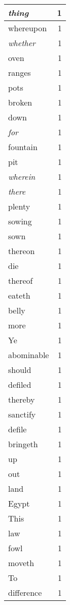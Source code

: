 \begin{center}
\begin{longtable}{l|r}
\emph{thing} & 1 \\ \hline
whereupon & 1 \\ \hline
\emph{whether} & 1 \\ \hline
oven & 1 \\ \hline
ranges & 1 \\ \hline
pots & 1 \\ \hline
broken & 1 \\ \hline
down & 1 \\ \hline
\emph{for} & 1 \\ \hline
fountain & 1 \\ \hline
pit & 1 \\ \hline
\emph{wherein} & 1 \\ \hline
\emph{there} & 1 \\ \hline
plenty & 1 \\ \hline
sowing & 1 \\ \hline
sown & 1 \\ \hline
thereon & 1 \\ \hline
die & 1 \\ \hline
thereof & 1 \\ \hline
eateth & 1 \\ \hline
belly & 1 \\ \hline
more & 1 \\ \hline
Ye & 1 \\ \hline
abominable & 1 \\ \hline
should & 1 \\ \hline
defiled & 1 \\ \hline
thereby & 1 \\ \hline
sanctify & 1 \\ \hline
defile & 1 \\ \hline
bringeth & 1 \\ \hline
up & 1 \\ \hline
out & 1 \\ \hline
land & 1 \\ \hline
Egypt & 1 \\ \hline
This & 1 \\ \hline
law & 1 \\ \hline
fowl & 1 \\ \hline
moveth & 1 \\ \hline
To & 1 \\ \hline
difference & 1 \\ \hline
\end{longtable}
\end{center}



